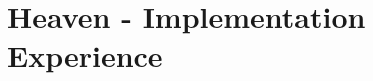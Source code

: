 \documentclass[12pt,a4paper,twoside,openright]{report}
\begin{document}
\setcounter{page}{1}
\pagestyle{empty}



\pagestyle{fancy}
\renewcommand{\contentsname}{Table of Contents}%

%

%

\chapter{Heaven - Implementation Experience}
\label{chap:implementation-experience}

\end{document}
